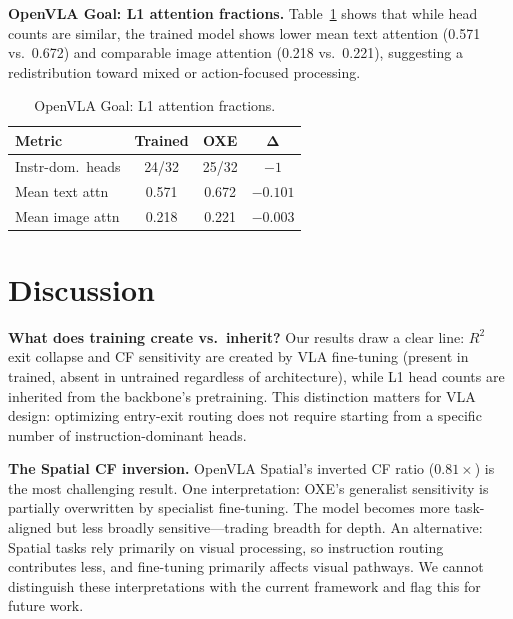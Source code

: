 \documentclass[10pt,twocolumn]{article}
\begin{document}
\textbf{OpenVLA Goal: L1 attention fractions.}
Table~\ref{tab:openvla_goal_l1} shows that while head counts are similar, the trained model shows lower mean text attention (0.571 vs.\ 0.672) and comparable image attention (0.218 vs.\ 0.221), suggesting a redistribution toward mixed or action-focused processing.

\begin{table}[t]
\centering
\caption{OpenVLA Goal: L1 attention fractions.}
\label{tab:openvla_goal_l1}
\small
\begin{tabular}{@{}lccc@{}}
\toprule
\textbf{Metric} & \textbf{Trained} & \textbf{OXE} & $\boldsymbol{\Delta}$ \\
\midrule
Instr-dom.\ heads & 24/32 & 25/32 & $-1$ \\
Mean text attn & 0.571 & 0.672 & $-0.101$ \\
Mean image attn & 0.218 & 0.221 & $-0.003$ \\
\bottomrule
\end{tabular}
\end{table}

\section{Discussion}
\label{sec:discussion}

\textbf{What does training create vs.\ inherit?}
Our results draw a clear line: $R^2$ exit collapse and CF sensitivity are created by VLA fine-tuning (present in trained, absent in untrained regardless of architecture), while L1 head counts are inherited from the backbone's pretraining.
This distinction matters for VLA design: optimizing entry-exit routing does not require starting from a specific number of instruction-dominant heads.

\textbf{The Spatial CF inversion.}
OpenVLA Spatial's inverted CF ratio ($0.81\times$) is the most challenging result.
One interpretation: OXE's generalist sensitivity is partially overwritten by specialist fine-tuning. The model becomes more task-aligned but less broadly sensitive---trading breadth for depth.
An alternative: Spatial tasks rely primarily on visual processing, so instruction routing contributes less, and fine-tuning primarily affects visual pathways.
We cannot distinguish these interpretations with the current framework and flag this for future work.
\end{document}
